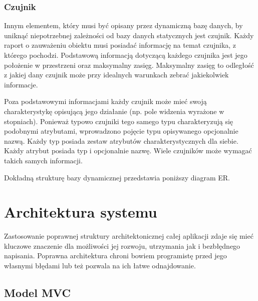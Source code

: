 {\subsubsection{Czujnik}
\par{
Innym elementem, który musi być opisany przez dynamiczną bazę danych, by uniknąć niepotrzebnej zależności od bazy danych statycznych jest czujnik. Każdy raport o zauważeniu obiektu musi posiadać informację na temat czujnika, z którego pochodzi. Podstawową informacją dotyczącą każdego czujnika jest jego położenie w przestrzeni oraz maksymalny zasięg. Maksymalny zasięg to odległość z jakiej dany czujnik może przy idealnych warunkach zebrać jakiekolwiek informacje.
}
\par{
Poza podstawowymi informacjami każdy czujnik może mieć swoją charakterystykę opisującą jego działanie (np. pole widzenia wyrażone w stopniach). Ponieważ typowo czujniki tego samego typu charakteryzują się podobnymi atrybutami, wprowadzono pojęcie typu opisywanego opcjonalnie nazwą. Każdy typ posiada zestaw atrybutów charakterystycznych dla siebie. Każdy atrybut posiada typ i opcjonalnie nazwę. Wiele czujników może wymagać takich samych informacji.
}
\par{
Dokładną strukturę bazy dynamicznej przedstawia poniższy diagram ER.
}


\section[Architektura systemu][Architektura systemu]{Architektura systemu}
\par{
Zastosowanie poprawnej struktury architektonicznej całej aplikacji zdaje się mieć kluczowe znaczenie dla możliwości jej rozwoju, utrzymania jak i bezbłędnego napisania. Poprawna architektura chroni bowiem programistę przed jego własnymi błędami lub też pozwala na ich łatwe odnajdowanie.
}
\subsection{Model MVC}
}
